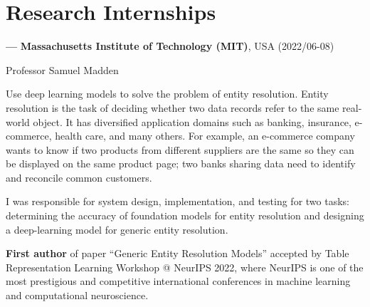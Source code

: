 \documentclass[10pt,a4paper,sans]{./moderncv/moderncv}
\begin{document}
\maketitle

\vspace{-1em}


\section{Research Internships}

\cvline
{\textbf{\Large ---}}
{\large\textbf{Massachusetts Institute of Technology (MIT)}, USA (2022/06-08)}

{Professor Samuel Madden}

{Use deep learning models to solve the problem of entity resolution. Entity resolution is the task of deciding whether two data records refer to the same real-world object. It has diversified application domains such as banking, insurance, e-commerce, health care, and many others. For example, an e-commerce company wants to know if two products from different suppliers are the same so they can be displayed on the same product page; two banks sharing data need to identify and reconcile common customers.}

{I was responsible for system design, implementation, and testing for two tasks: determining the accuracy of foundation models for entity resolution and designing a deep-learning model for generic entity resolution.}

{\textbf{First author} of paper ``Generic Entity Resolution Models'' accepted by Table Representation Learning Workshop @ NeurIPS 2022, where NeurIPS is one of the most prestigious and competitive international conferences in machine learning and computational neuroscience.}
\end{document}

